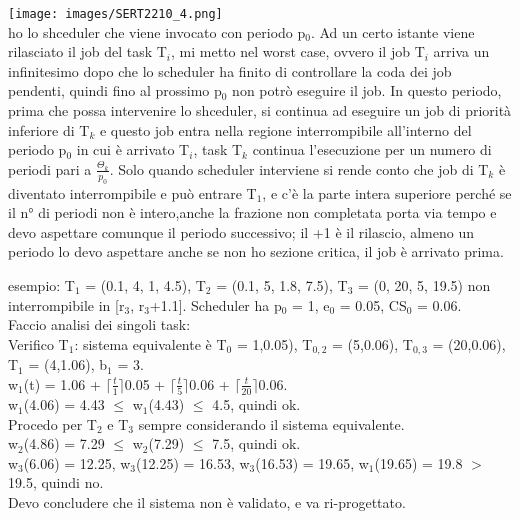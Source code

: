 \documentclass[18px]{article}
\begin{document}
\begin{itemize}
\texttt{[image: images/SERT2210\_4.png]}\\
ho lo shceduler che viene invocato con periodo p$_{0}$. Ad un certo istante viene rilasciato il job del task T$_{i}$, mi metto nel worst case, ovvero il job T$_{i}$ arriva un infinitesimo dopo che lo scheduler ha finito di controllare la coda dei job pendenti, quindi fino al prossimo p$_{0}$ non potrò eseguire il job. In questo periodo, prima che possa intervenire lo shceduler, si continua ad eseguire un job di priorità inferiore di T$_{k}$ e questo job entra nella regione interrompibile all'interno del periodo p$_{0}$ in cui è arrivato T$_{i}$, task T$_{k}$ continua l'esecuzione per un numero di periodi pari a $\frac{\Theta_{k}}{p_{0}}$. Solo quando scheduler interviene si rende conto che job di T$_{k}$ è diventato interrompibile e può entrare T$_{1}$, e c'è la parte intera superiore perché se il n° di periodi non è intero,anche la frazione non completata porta via tempo e devo aspettare comunque il periodo successivo; il +1 è il rilascio, almeno un periodo lo devo aspettare anche se non ho sezione critica, il job è arrivato prima.
\end{itemize}
esempio: T$_{1}$ = (0.1, 4, 1, 4.5), T$_{2}$ = (0.1, 5, 1.8, 7.5), T$_{3}$ = (0, 20, 5, 19.5) non interrompibile in [r$_{3}$, r$_{3}$+1.1]. Scheduler ha p$_{0}$ = 1, e$_{0}$ = 0.05, CS$_{0}$ = 0.06.\\ Faccio analisi dei singoli task:\\
Verifico T$_{1}$: sistema equivalente è T$_{0}$ = 1,0.05), T$_{0,2}$ = (5,0.06), T$_{0,3}$ = (20,0.06), T$_{1}$ = (4,1.06), b$_{1}$ = 3.\\ w$_{1}$(t)
 = 1.06 + $\lceil \frac{t}{1}\rceil$0.05 + $\lceil \frac{t}{5}\rceil$0.06 + $\lceil \frac{t}{20}\rceil$0.06.\\
w$_{1}$(4.06) = 4.43 $\leq$ w$_{1}$(4.43) $\leq$ 4.5, quindi ok.\\
Procedo per T$_{2}$ e T$_{3}$ sempre considerando il sistema equivalente.\\ w$_{2}$(4.86) = 7.29 $\leq$ w$_{2}$(7.29) $\leq$ 7.5, quindi ok.\\
w$_{3}$(6.06) = 12.25,  w$_{3}$(12.25) = 16.53, w$_{3}$(16.53) = 19.65, w$_{1}$(19.65) = 19.8 $>$ 19.5, quindi no.\\ Devo concludere che il sistema non è validato, e va ri-progettato.
\end{document}
